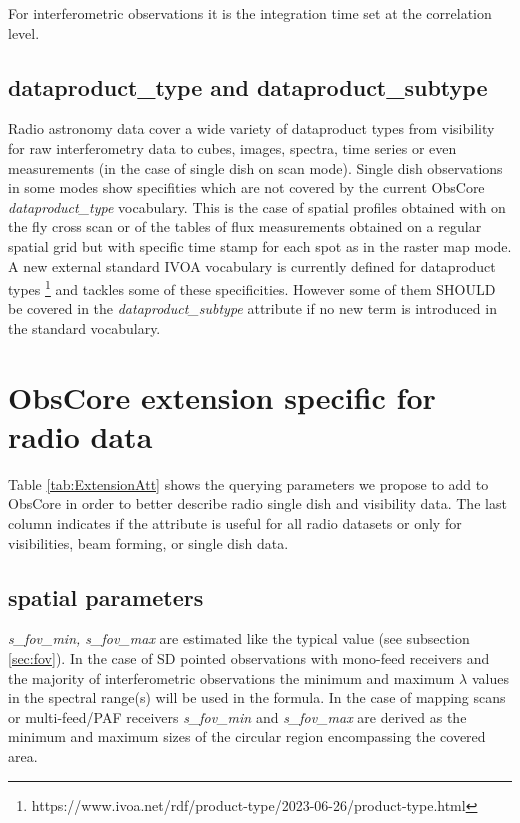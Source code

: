 \documentclass[11pt,a4paper]{ivoa}
\begin{document}
For interferometric observations it is the integration time set at the correlation level.


\subsection{dataproduct\_type and dataproduct\_subtype}

Radio astronomy data cover a wide variety of dataproduct types from visibility for raw interferometry data to cubes, images, spectra, time series or even measurements (in the case of single dish on scan mode). Single dish observations in some modes show specifities which are not covered by the current ObsCore \emph{dataproduct\_type} vocabulary. This is the case of spatial profiles obtained with on the fly cross scan or of the tables of flux measurements obtained on a regular spatial grid but with specific time stamp for each spot as in the raster map  mode.
A new external standard IVOA vocabulary is currently defined for dataproduct types \footnote{https://www.ivoa.net/rdf/product-type/2023-06-26/product-type.html} and tackles some of these specificities.
However some of them SHOULD be covered in the \emph{dataproduct\_subtype} attribute if no new term is introduced in the standard vocabulary.

\section{ObsCore extension specific for radio data}

Table \ref{tab:ExtensionAtt} shows the %
querying parameters we propose to add to ObsCore in order to better describe radio single dish and visibility data.
The last column indicates if the attribute is useful for all radio datasets or only for visibilities, beam forming, or single dish data.

\subsection{spatial parameters}
\emph{s\_fov\_min, s\_fov\_max} are estimated like the typical value (see subsection \ref{sec:fov}). 
In the case of SD pointed observations with mono-feed receivers and the majority of interferometric observations the minimum and maximum $\lambda$ values in the spectral range(s) will be used in the formula. In the case of mapping scans or multi-feed/PAF receivers \emph{ s\_fov\_min} and \emph{s\_fov\_max} are derived as the minimum and maximum sizes of the circular region encompassing the covered area.
\end{document}

